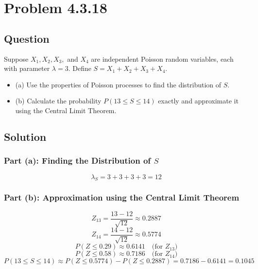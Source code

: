 \documentclass[12pt]{article}
\begin{document}
\newpage

\section*{Problem 4.3.18}
\subsection*{Question}
Suppose \(X_1, X_2, X_3,\) and \(X_4\) are independent Poisson random variables, each with parameter \(\lambda = 3\). Define \(S = X_1 + X_2 + X_3 + X_4\).
\begin{itemize}
    \item (a) Use the properties of Poisson processes to find the distribution of \(S\).
    \item (b) Calculate the probability \(P(13 \leq S \leq 14)\) exactly and approximate it using the Central Limit Theorem.
\end{itemize}

\subsection*{Solution}
\subsubsection*{Part (a): Finding the Distribution of \(S\)}
\[
\lambda_S = 3 + 3 + 3 + 3 = 12
\]

\subsubsection*{Part (b): Approximation using the Central Limit Theorem}
\[
Z_{13} = \frac{13 - 12}{\sqrt{12}} \approx 0.2887
\]
\[
Z_{14} = \frac{14 - 12}{\sqrt{12}} \approx 0.5774
\]
\[
P(Z \leq 0.29) \approx 0.6141 \quad \text{(for } Z_{13}\text{)}
\]
\[
P(Z \leq 0.58) \approx 0.7186 \quad \text{(for } Z_{14}\text{)}
\]
\[
P(13 \leq S \leq 14) \approx P(Z \leq 0.5774) - P(Z \leq 0.2887) = 0.7186 - 0.6141 = 0.1045
\]
\end{document}
